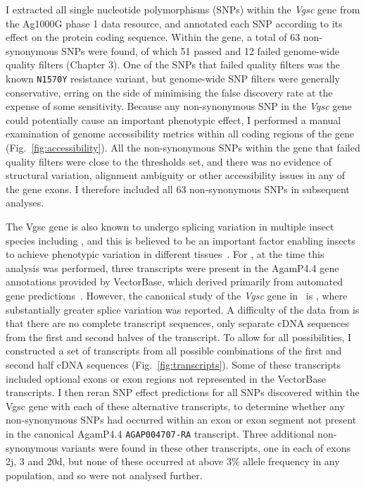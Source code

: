 \begin{refsection}
I extracted all single nucleotide polymorphisms (SNPs) within the \textit{Vgsc} gene from the Ag1000G phase 1 data resource, and annotated each SNP according to its effect on the protein coding sequence.
%
Within the gene, a total of 63 non-synonymous SNPs were found, of which 51 passed and 12 failed genome-wide quality filters (Chapter 3).
%
One of the SNPs that failed quality filters was the known \texttt{N1570Y} resistance variant, but genome-wide SNP filters were generally conservative, erring on the side of minimising the false discovery rate at the expense of some sensitivity.
%
Because any non-synonymous SNP in the \textit{Vgsc} gene could potentially cause an important phenotypic effect, I performed a manual examination of genome accessibility metrics within all coding regions of the gene (Fig.~\ref{fig:accessibility}).
%
All the non-synonymous SNPs within the gene that failed quality filters were close to the thresholds set, and there was no evidence of structural variation, alignment ambiguity or other accessibility issues in any of the gene exons.
%
I therefore included all 63 non-synonymous SNPs in subsequent analyses.


The Vgsc gene is also known to undergo splicing variation in multiple insect species including \agam, and this is believed to be an important factor enabling insects to achieve phenotypic variation in different tissues~\parencite{Dong2014,Davies2007}.
%
For \agam, at the time this analysis was performed, three transcripts were present in the AgamP4.4 gene annotations provided by VectorBase, which derived primarily from automated gene predictions~\parencite{Curwen2004}.
%
However, the canonical study of the \textit{Vgsc} gene in \agam\ is \textcite{Davies2007}, where substantially greater splice variation was reported.
%
A difficulty of the data from \textcite{Davies2007} is that there are no complete transcript sequences, only separate cDNA sequences from the first and second halves of the transcript.
%
To allow for all possibilities, I constructed a set of transcripts from all possible combinations of the first and second half cDNA sequences (Fig.~\ref{fig:transcripts}).
%
Some of these transcripts included optional exons or exon regions not represented in the VectorBase transcripts.
%
I then reran SNP effect predictions for all SNPs discovered within the Vgsc gene with each of these alternative transcripts, to determine whether any non-synonymous SNPs had occurred within an exon or exon segment not present in the canonical AgamP4.4 \texttt{AGAP004707-RA} transcript.
%
Three additional non-synonymous variants were found in these other transcripts, one in each of exons 2j, 3 and 20d, but none of these occurred at above 3\% allele frequency in any population, and so were not analysed further.



\end{refsection}
